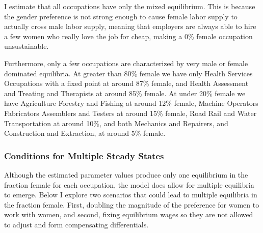 \documentclass[12pt]{article}
\begin{document}


I estimate that all occupations have only the mixed equilibrium. This is because the gender preference is not strong enough to cause female labor supply to actually cross male labor supply, meaning that employers are always able to hire a few women who really love the job for cheap, making a 0\% female occupation unsustainable.


Furthermore, only a few occupations are characterized by very male or female dominated equilibria. At greater than 80\% female we have only Health Services Occupations with a fixed point at around 87\% female, and Health Assessment and Treating and Therapists at around 85\% female. At under 20\% female we have Agriculture Forestry and Fishing at around 12\% female, Machine Operators Fabricators Assemblers and Testers at around 15\% female, Road Rail and Water Transportation at around 10\%, and both Mechanics and Repairers, and Construction and Extraction, at around 5\% female.


\subsubsection{Conditions for Multiple Steady States}
Although the estimated parameter values produce only one equilibrium in the fraction female for each occupation, the model does allow for multiple equilibria to emerge. Below I explore two scenarios that could lead to multiple equilibria in the fraction female. First, doubling the magnitude of the preference for women to work with women, and second, fixing equilibrium wages so they are not allowed to adjust and form compensating differentials.
\end{document}
